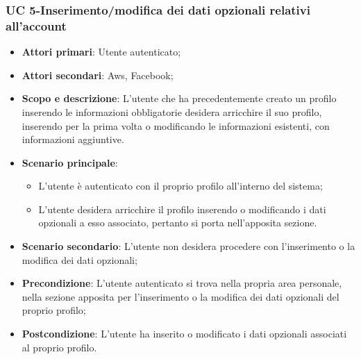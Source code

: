         
    \subsubsection{UC 5-Inserimento/modifica dei dati opzionali relativi all'account}  
      \begin{itemize}
        \item \textbf{Attori primari}: Utente autenticato;
        \item \textbf{Attori secondari}: Aws, Facebook;
        \item \textbf{Scopo e descrizione}: L'utente che ha precedentemente creato un profilo inserendo le informazioni obbligatorie desidera arricchire il suo profilo, inserendo per la prima volta o modificando le informazioni esistenti, con informazioni aggiuntive.
        \item \textbf{Scenario principale}:
            \begin{itemize}
                \item L'utente è autenticato con il proprio profilo all'interno del sistema;
                \item L'utente desidera arricchire il profilo inserendo o modificando i dati opzionali a esso associato, pertanto si porta nell'apposita sezione.
            \end{itemize}
        \item \textbf{Scenario secondario}: L'utente non desidera procedere con l'inserimento o la modifica dei dati opzionali;
        \item \textbf{Precondizione}: L'utente autenticato si trova nella propria area personale, nella sezione apposita per l'inserimento o la modifica dei dati opzionali del proprio profilo;
        \item \textbf{Postcondizione}: L'utente ha inserito o modificato i dati opzionali associati al proprio profilo.
        \end{itemize}


        
